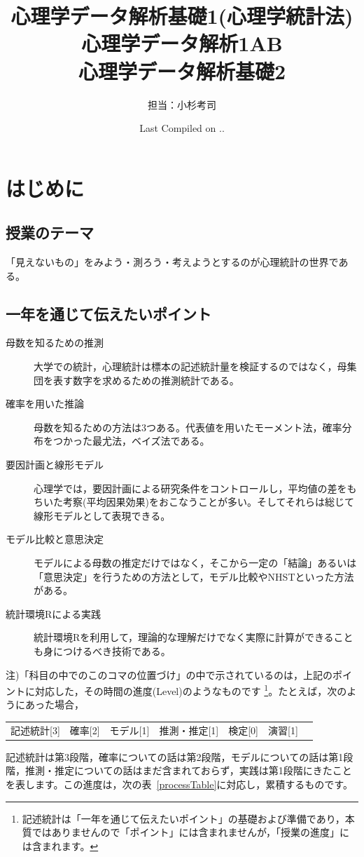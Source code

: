 \documentclass[dvipsnames]{ltjsarticle}
\begin{document}
\title{心理学データ解析基礎1(心理学統計法)\\心理学データ解析1AB\\心理学データ解析基礎2}
\author{担当：小杉考司}
\date{Last Compiled on \number\year .\number\month .\number\day}
\maketitle

\setcounter{tocdepth}{1}
\newpage
\section*{はじめに}
\subsection*{授業のテーマ}

「見えないもの」をみよう・測ろう・考えようとするのが心理統計の世界である。

\subsection*{一年を通じて伝えたいポイント}
\begin{description}
	\item[母数を知るための推測] 大学での統計，心理統計は標本の記述統計量を検証するのではなく，母集団を表す数字を求めるための推測統計である。
	\item[確率を用いた推論] 母数を知るための方法は3つある。代表値を用いたモーメント法，確率分布をつかった最尤法，ベイズ法である。
	\item[要因計画と線形モデル] 心理学では，要因計画による研究条件をコントロールし，平均値の差をもちいた考察(平均因果効果)をおこなうことが多い。そしてそれらは総じて線形モデルとして表現できる。
	\item[モデル比較と意思決定] モデルによる母数の推定だけではなく，そこから一定の「結論」あるいは「意思決定」を行うための方法として，モデル比較やNHSTといった方法がある。
	\item[統計環境Rによる実践] 統計環境Rを利用して，理論的な理解だけでなく実際に計算ができることも身につけるべき技術である。
\end{description}

注)「科目の中でのこのコマの位置づけ」の中で示されているのは，上記のポイントに対応した，その時間の進度(Level)のようなものです
\footnote{記述統計は「一年を通じて伝えたいポイント」の基礎および準備であり，本質ではありませんので「ポイント」には含まれませんが，「授業の進度」には含まれます。}。たとえば，次のようにあった場合，
\begin{tcolorbox}
	\begin{tabular}[t]{ccccccc}
		記述統計[3] & 確率[2] & モデル[1] & 推測・推定[1] & 検定[0] & 演習[1]
	\end{tabular}
\end{tcolorbox}
記述統計は第3段階，確率についての話は第2段階，モデルについての話は第1段階，推測・推定についての話はまだ含まれておらず，実践は第1段階にきたことを表します。この進度は，次の表~\ref{processTable}に対応し，累積するものです。
\end{document}
